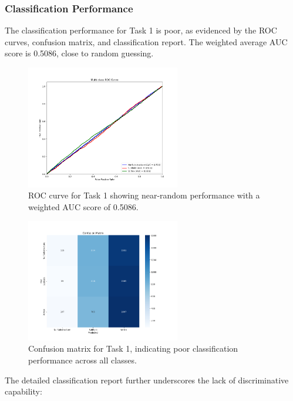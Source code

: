 \documentclass[11pt,a4paper]{article}
\begin{document}
\subsubsection{Classification Performance}
The classification performance for Task 1 is poor, as evidenced by the ROC curves, confusion matrix, and classification report. The weighted average AUC score is 0.5086, close to random guessing.

\begin{figure}[H]
    \centering
    \includegraphics[width=0.6\textwidth]{../Task1/results/roc_curve_multi.png}
    \caption{ROC curve for Task 1 showing near-random performance with a weighted AUC score of 0.5086.}
    \label{fig:roc_curve_multi}
\end{figure}

\begin{figure}[H]
    \centering
    \includegraphics[width=0.6\textwidth]{../Task1/results/confusion_matrix_multi.png}
    \caption{Confusion matrix for Task 1, indicating poor classification performance across all classes.}
    \label{fig:confusion_matrix_multi}
\end{figure}

The detailed classification report further underscores the lack of discriminative capability:
\end{document}

